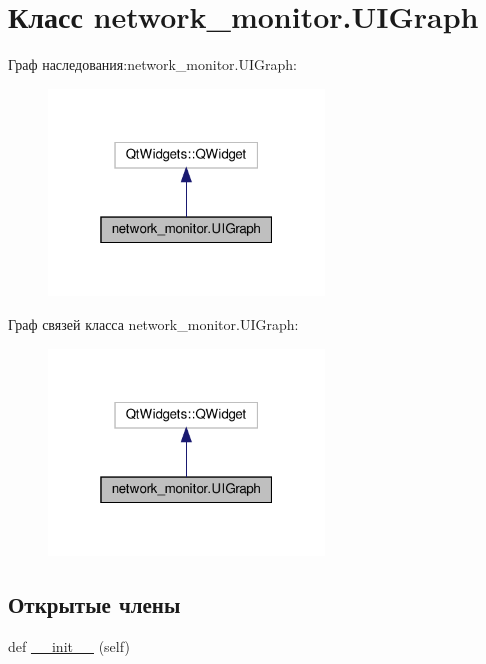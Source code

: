 \hypertarget{classnetwork__monitor_1_1_u_i_graph}{}\section{Класс network\+\_\+monitor.\+U\+I\+Graph}
\label{classnetwork__monitor_1_1_u_i_graph}


Граф наследования\+:network\+\_\+monitor.\+U\+I\+Graph\+:\nopagebreak
\begin{figure}[H]
\begin{center}
\leavevmode
\includegraphics[width=208pt]{classnetwork__monitor_1_1_u_i_graph__inherit__graph}
\end{center}
\end{figure}


Граф связей класса network\+\_\+monitor.\+U\+I\+Graph\+:\nopagebreak
\begin{figure}[H]
\begin{center}
\leavevmode
\includegraphics[width=208pt]{classnetwork__monitor_1_1_u_i_graph__coll__graph}
\end{center}
\end{figure}
\subsection*{Открытые члены}
\begin{DoxyCompactItemize}
\item 
def \hyperlink{classnetwork__monitor_1_1_u_i_graph_a6226e31f29149231ae294fdfa67a6fc7}{\+\_\+\+\_\+init\+\_\+\+\_\+} (self)
\end{DoxyCompactItemize}


